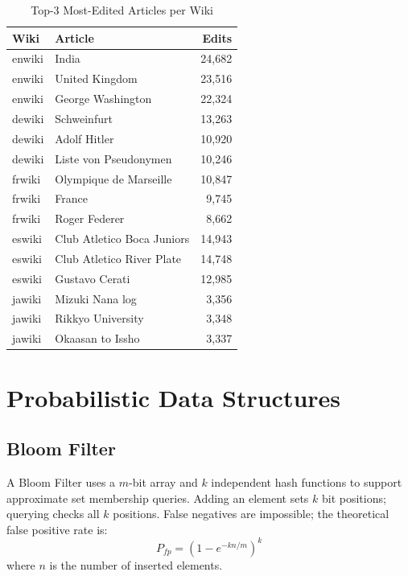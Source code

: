 \documentclass[conference]{IEEEtran}
\begin{document}
\begin{table}[htbp]
\caption{Top-3 Most-Edited Articles per Wiki}
\label{tab:toparticles}
\centering
\begin{tabular}{llr}
\toprule
\textbf{Wiki} & \textbf{Article} & \textbf{Edits} \\
\midrule
enwiki & India                      & 24,682 \\
enwiki & United Kingdom             & 23,516 \\
enwiki & George Washington          & 22,324 \\
\midrule
dewiki & Schweinfurt                & 13,263 \\
dewiki & Adolf Hitler               & 10,920 \\
dewiki & Liste von Pseudonymen      & 10,246 \\
\midrule
frwiki & Olympique de Marseille     & 10,847 \\
frwiki & France                     &  9,745 \\
frwiki & Roger Federer              &  8,662 \\
\midrule
eswiki & Club Atletico Boca Juniors & 14,943 \\
eswiki & Club Atletico River Plate  & 14,748 \\
eswiki & Gustavo Cerati             & 12,985 \\
\midrule
jawiki & Mizuki Nana log            &  3,356 \\
jawiki & Rikkyo University          &  3,348 \\
jawiki & Okaasan to Issho           &  3,337 \\
\bottomrule
\end{tabular}
\end{table}

\section{Probabilistic Data Structures}

\subsection{Bloom Filter}

A Bloom Filter \cite{bloom1970} uses a $m$-bit array and $k$ independent hash functions to support approximate set membership queries. Adding an element sets $k$ bit positions; querying checks all $k$ positions. False negatives are impossible; the theoretical false positive rate is:
\begin{equation}
  P_{fp} = \left(1 - e^{-kn/m}\right)^k
\end{equation}
where $n$ is the number of inserted elements.
\end{document}
